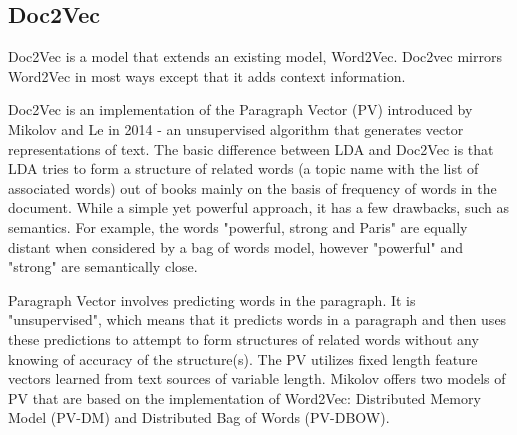 



\subsection{Doc2Vec}
Doc2Vec is a model that extends an existing model, Word2Vec. Doc2vec mirrors Word2Vec in most ways except that it adds context information. \cite{RefWorks:doc:5a6e5748e4b0d609eec798dd}






Doc2Vec is an implementation of the Paragraph Vector (PV) introduced by Mikolov and Le in 2014 - an unsupervised algorithm that generates vector representations of text. \cite{RefWorks:doc:5a6e5746e4b0d609eec798d7}  The basic difference between LDA and Doc2Vec is that LDA tries to form a structure of related words (a topic name with the list of associated words) out of books mainly on the basis of frequency of words in the document. While a simple yet powerful approach, it has a few drawbacks, such as semantics. For example, the words "powerful, strong and Paris" are equally distant when considered by a bag of words model, however "powerful" and "strong" are semantically close. \cite{RefWorks:doc:5a6e5746e4b0d609eec798d7}
	
Paragraph Vector involves predicting words in the paragraph. It is "unsupervised", which means that it predicts words in a paragraph and then uses these predictions to attempt to form structures of related words without any knowing of accuracy of the structure(s). The PV utilizes fixed length feature vectors learned from text sources of variable length. Mikolov offers two models of PV that are based on the implementation of Word2Vec: Distributed Memory Model (PV-DM) and Distributed Bag of Words (PV-DBOW). 

